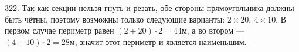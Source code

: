 322. Так как секции нельзя гнуть и резать, обе стороны прямоугольника должны быть чётны, поэтому возможны только следующие варианты: $2\times20,\ 4\times10.$  В первом случае периметр равен $(2+20)\cdot2=44$м, а во втором --- $(4+10)\cdot2=28$м, значит этот периметр и является наименьшим.\\

